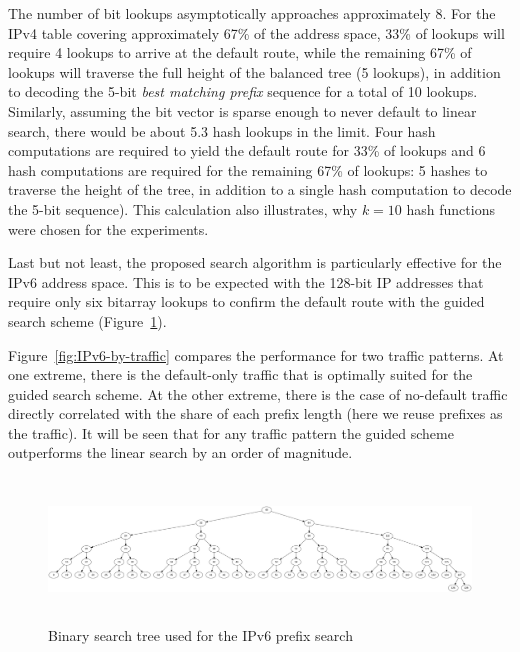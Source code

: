 \documentclass[conference,compsoc]{IEEEtran}
\begin{document}
The number of bit lookups asymptotically approaches approximately 8. 
For the IPv4 table covering
approximately 67\% of the address space, 33\% of lookups will
require 4 lookups to arrive at the default route, while the remaining
67\% of lookups will
traverse the full height of the balanced tree (5 lookups), in addition to
decoding the 5-bit \emph{best matching prefix} sequence for a total of
10 lookups. Similarly, assuming the bit vector is sparse enough to never
default to linear search, there would be about 5.3 hash lookups in the limit.
Four hash computations are required to yield the default route for
33\% of lookups and 6 hash computations are required
for the remaining 67\% of lookups: 5 hashes to traverse the height of the 
tree, in addition to a single hash computation to decode the 5-bit sequence).
This calculation also illustrates, why $k=10$ hash functions were chosen
for the experiments.

Last but not least, the proposed search algorithm is particularly effective
for the IPv6 address space. This is to be expected with the 128-bit IP
addresses that require only six bitarray lookups to confirm the default
route with the guided search scheme (Figure~\ref{fig:IPv6-tree}).

Figure~\ref{fig:IPv6-by-traffic} compares the performance for two traffic 
patterns. At one extreme, there is the default-only
traffic that is optimally suited for the guided search scheme. At the other
extreme, there is the case of no-default traffic directly correlated with 
the share of each prefix
length (here we reuse prefixes as the traffic). It will be seen that for any
traffic pattern the guided scheme outperforms the linear search
by an order of magnitude.

\begin{figure}[h]
\centering
\includegraphics[height=1.5in]{../img/ipv6_balanced_tree.png}
  \caption{Binary search tree used for the IPv6 prefix search}
\label{fig:IPv6-tree}
\end{figure}
\end{document}
